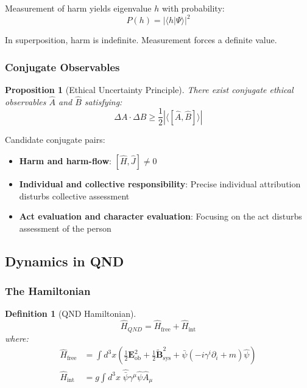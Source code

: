 \documentclass[12pt]{article}
\newtheorem{definition}{Definition}[section]
\newtheorem{proposition}{Proposition}[section]
\begin{document}
Measurement of harm yields eigenvalue $h$ with probability:
\begin{equation}
    P(h) = |\langle h | \Psi \rangle|^2
\end{equation}

In superposition, harm is indefinite. Measurement forces a definite value.

\subsubsection{Conjugate Observables}

\begin{proposition}[Ethical Uncertainty Principle]
\emph{There exist conjugate ethical observables $\hat{A}$ and $\hat{B}$ satisfying:}
\begin{equation}
    \Delta A \cdot \Delta B \geq \frac{1}{2} |\langle [\hat{A}, \hat{B}] \rangle|
\end{equation}
\end{proposition}

Candidate conjugate pairs:
\begin{itemize}
    \item \textbf{Harm and harm-flow}: $[\hat{H}, \hat{J}] \neq 0$
    \item \textbf{Individual and collective responsibility}: Precise individual attribution disturbs collective assessment
    \item \textbf{Act evaluation and character evaluation}: Focusing on the act disturbs assessment of the person
\end{itemize}

\subsection{Dynamics in QND}

\subsubsection{The Hamiltonian}

\begin{definition}[QND Hamiltonian]
\begin{equation}
    \hat{H}_{QND} = \hat{H}_{\text{free}} + \hat{H}_{\text{int}}
\end{equation}
where:
\begin{align}
    \hat{H}_{\text{free}} &= \int d^3x \left( \frac{1}{2} \mathbf{E}_{\text{ob}}^2 + \frac{1}{2} \tilde{\mathbf{B}}_{\text{sys}}^2 + \bar{\psi}(-i\gamma^i \partial_i + m)\hat{\psi} \right) \\
    \hat{H}_{\text{int}} &= g \int d^3x \; \hat{\bar{\psi}} \gamma^\mu \hat{\psi} \hat{A}_\mu
\end{align}
\end{definition}
\end{document}
